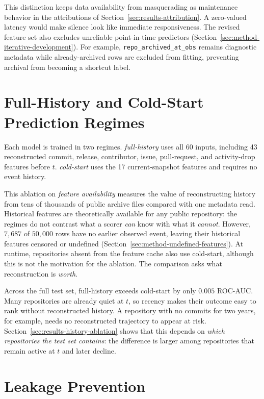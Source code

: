 This distinction keeps data availability from masquerading as maintenance
behavior in the attributions of Section~\ref{sec:results-attribution}. A
zero-valued latency would make silence look like immediate responsiveness. The
revised feature set also excludes unreliable point-in-time predictors
(Section~\ref{sec:method-iterative-development}). For example,
\texttt{repo\_archived\_at\_obs} remains diagnostic metadata while
already-archived rows are excluded from fitting, preventing archival from
becoming a shortcut label.

\section{Full-History and Cold-Start Prediction Regimes}
\label{sec:method-prediction-regimes}

Each model is trained in two regimes. \emph{full-history} uses all 60 inputs,
including 43 reconstructed commit, release, contributor, issue, pull-request, and
activity-drop features before \(t\). \emph{cold-start} uses the 17
current-snapshot features and requires no event history.

This ablation on \emph{feature availability} measures the value of reconstructing
history from tens of thousands of public archive files compared with one metadata
read. Historical features are theoretically available for any public repository:
the regimes do not contrast what a scorer \emph{can} know with what it
\emph{cannot}.
However, \(7{,}687\) of \(50{,}000\) rows have no earlier observed event, leaving
their historical features censored or undefined
(Section~\ref{sec:method-undefined-features}). At runtime, repositories absent
from the feature cache also use cold-start, although this is not the motivation
for the ablation. The comparison asks what reconstruction is \emph{worth}.

Across the full test set, full-history exceeds cold-start by only \(0.005\)
ROC-AUC. Many repositories are already quiet at \(t\), so recency makes their
outcome easy to rank without reconstructed history. A repository with no commits
for two years, for example, needs no reconstructed trajectory to appear at risk.
Section~\ref{sec:results-history-ablation} shows that this depends on
\emph{which repositories the test set contains}: the difference is larger among
repositories that remain active at \(t\) and later decline.

\section{Leakage Prevention}
\label{sec:method-leakage-prevention}


